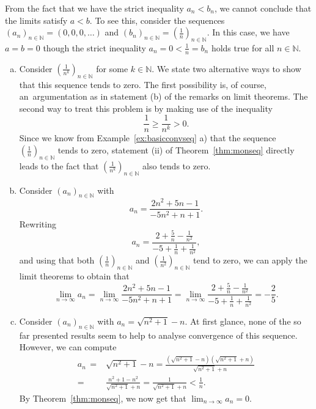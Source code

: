 \begin{Attention}{}
  From the fact that we have the strict inequality $a_n<b_n$, we cannot conclude that the limits satisfy $a<b$. To see this, consider the sequences\linebreak $(a_n)_{n\in\mathbb{N}}=(0,0,0,\ldots)$ and
  $(b_n)_{n\in\mathbb{N}}=(\frac1n)_{n\in\mathbb{N}}$. In this case, we have $a=b=0$ though the strict inequality $a_n=0<\frac1n=b_n$ holds true for all $n\in\mathbb{N}$.
\end{Attention}

\begin{example}
\begin{enumerate}[a)]
  \item Consider $(\frac1{n^k})_{n\in\mathbb{N}}$ for some $k\in\mathbb{N}$. We state two alternative ways to show that this sequence tends to zero.
The first possibility is, of course, an~argumentation as in statement (b) of the remarks on limit theorems. The second way to treat this problem is by making use of the inequality
\[\frac1n\geq\frac1{n^k}>0.\]
    Since we know from Example~\ref{ex:basicconvseq} a) that the sequence $(\frac1n)_{n\in\mathbb{N}}$ tends to zero, statement (ii) of Theorem~\ref{thm:monseq} directly leads to the fact that
    $(\frac1{n^k})_{n\in\mathbb{N}}$ also tends to zero.
  \item Consider $(a_n)_{n\in\mathbb{N}}$ with
\[a_n=\frac{2n^2+5n-1}{-5n^2+n+1}.\]
Rewriting
\[a_n=\frac{2+\frac5n-\frac1{n^2}}{-5+\frac1n+\frac1{n^2}},\]
    and using that both $(\frac1{n})_{n\in\mathbb{N}}$ and $(\frac1{n^2})_{n\in\mathbb{N}}$ tend to zero, we can apply the limit theorems to obtain that
\[\lim_{n\to\infty}a_n=\lim_{n\to\infty}\frac{2n^2+5n-1}{-5n^2+n+1}=\lim_{n\to\infty}\frac{2+\frac5n-\frac1{n^2}}{-5+\frac1n+\frac1{n^2}}=-\frac25.\]
\item Consider $(a_n)_{n\in\mathbb{N}}$ with $a_n=\sqrt{n^2+1}-n$. At first glance, none of the so far presented results seem to help to analyse convergence of this sequence. However, we can compute
\[
\begin{aligned}
a_n\,=&\sqrt{n^2+1}-n
=\frac{(\sqrt{n^2+1}-n)(\sqrt{n^2+1}+n)}{\sqrt{n^2+1}+n}\\
=&\frac{n^2+1-n^2}{\sqrt{n^2+1}+n}
=\frac{1}{\sqrt{n^2+1}+n}<\frac1n.
\end{aligned}
\]
By Theorem~\ref{thm:monseq}, we now get that $\lim_{n\to\infty}a_n=0$.
\end{enumerate}
\end{example}
